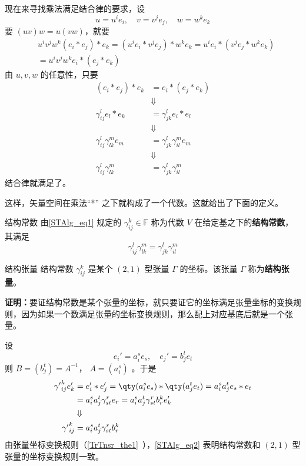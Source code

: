 现在来寻找乘法满足结合律的要求，设
\begin{equation}
u=u^ie_i,\quad v=v^je_j,\quad w=w^ke_k
\end{equation}
要 $(uv)w=u(vw)$，就要
\begin{equation}
\begin{aligned}
&u^iv^jw^k (e_i*e_j)*e_k=(u^ie_i *v^je_j)*w^ke_k=u^ie_i *(v^je_j*w^ke_k)\\
&=u^iv^jw^k e_i*(e_j*e_k)
\end{aligned}
\end{equation}
由 $u,v,w$ 的任意性，只要
\begin{equation}
\begin{aligned}
(e_i*e_j)*e_k&=e_i*(e_j*e_k)\\
&\Downarrow\\
\gamma_{ij}^le_l*e_k&=\gamma_{jk}^le_i*e_l\\
&\Downarrow\\
\gamma_{ij}^l\gamma_{lk}^{m}e_m&=\gamma_{jk}^l\gamma_{il}^m e_m\\
&\Downarrow\\
\gamma_{ij}^l\gamma_{lk}^{m}&=\gamma_{jk}^l\gamma_{il}^m
\end{aligned}
\end{equation}
结合律就满足了。

这样，矢量空间在乘法“*” 之下就构成了一个代数。这就给出了下面的定义。
\begin{definition}{结构常数}
由\autoref{STAlg_eq1} 规定的 $\gamma_{ij}^k\in\mathbb F$ 称为代数 $V$ 在给定基之下的\textbf{结构常数}，其满足
\begin{equation}
\gamma_{ij}^l\gamma_{lk}^{m}=\gamma_{jk}^l\gamma_{il}^m
\end{equation}
\end{definition}
\begin{theorem}{结构张量}
结构常数 $\gamma_{ij}^k$ 是某个 $(2,1)$ 型张量 $\Gamma$ 的坐标。该张量 $\Gamma$ 称为\textbf{结构张量}。
\end{theorem}
\textbf{证明：}要证结构常数是某个张量的坐标，就只要证它的坐标满足张量坐标的变换规则，因为如果一个数满足张量的坐标变换规则，那么配上对应基底后就是一个张量。

设
\begin{equation}
e_i'=a_i^s e_s,\quad e_j'=b_j^t e_t
\end{equation}
则 $B=(b_j^t)=A^{-1}$， $A=(a_i^s)$ 。于是
\begin{equation}\label{STAlg_eq2}
\begin{aligned}
{\gamma'}_{ij}^ke'_k&=e'_i*e'_j=\qty(a_i^s e_s)*\qty(a_j^t e_t)=a_i^s a_j^te_s*e_t\\
&=a_i^sa_j^t\gamma_{st}^r e_r=a_i^sa_j^t\gamma_{st}^r b_r^k e'_k\\
&\Downarrow\\
{\gamma'}_{ij}^k&=a_i^sa_j^t\gamma_{st}^r b_r^k
\end{aligned}
\end{equation}
由张量坐标变换规则（\autoref{TrTnsr_the1}~），\autoref{STAlg_eq2} 表明结构常数和 $(2,1)$ 型张量的坐标变换规则一致。

